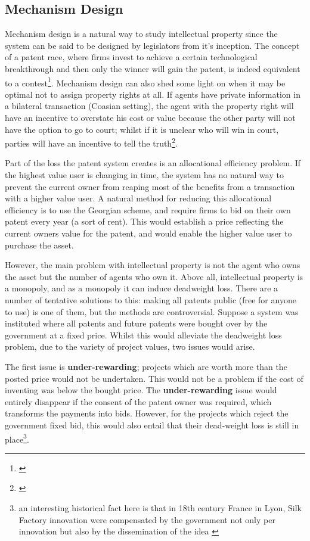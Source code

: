 \subsection{Mechanism Design}

Mechanism design is a natural way to study intellectual property since the system can be said to be designed by legislators from it's inception. The concept of a patent race, where firms invest to achieve a certain technological breakthrough and then only the winner will gain the patent, is indeed equivalent to a contest\footnote{ \cite{Games2003} }. Mechanism design can also shed some light on when it may be optimal not to assign property rights at all. If agents have private information in a bilateral transaction (Coasian setting), the agent with the property right will have an incentive to overstate his cost or value because the other party will not have the option to go to court; whilst if it is unclear who will win in court, parties will have an incentive to tell the truth\footnote{\cite{schmitz2001coase}}.


Part of the loss the patent system creates is an allocational efficiency problem. If the highest value user is changing in time, the system has no natural way to prevent the current owner from reaping most of the benefits from a transaction with a higher value user. A natural method for reducing this allocational efficiency is to use the Georgian scheme, and require firms to bid on their own patent every year (a sort of rent). This would establish a price reflecting the current owners value for the patent, and would enable the higher value user to purchase the asset. 

However, the main problem with intellectual property is not the agent who owns the asset but the number of agents who own it. Above all, intellectual property is a monopoly, and as a monopoly it can induce deadweight loss. There are a number of tentative solutions to this: making all patents public (free for anyone to use) is one of them, but the methods are controversial. Suppose a system was instituted where all patents and future patents were bought over by the government at a fixed price. Whilst this would alleviate the deadweight loss problem, due to the variety of project values, two issues would arise. 

The first issue is \textbf{under-rewarding}; projects which are worth more than the posted price would not be undertaken. This would not be a problem if the cost of inventing was below the bought price. The \textbf{under-rewarding} issue would entirely disappear if the consent of the patent owner was required, which transforms the payments into bids. However, for the projects which reject the government fixed bid, this would also entail that their dead-weight loss is still in place\footnote{an interesting historical fact here is that in 18th century France in Lyon, Silk Factory innovation were compensated by the government not only per innovation but also by the dissemination of the idea \cite{foray2013patent}}.

